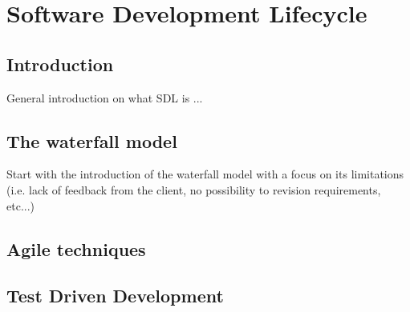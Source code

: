 \newpage
\section{Software Development Lifecycle}
\subsection{Introduction}
General introduction on what SDL is ...

\subsection{The waterfall model}
Start with the introduction of the waterfall model with a focus on its limitations (i.e. lack of feedback from the client, no possibility to revision requirements, etc...)


\subsection{Agile techniques}


\subsection{Test Driven Development}

